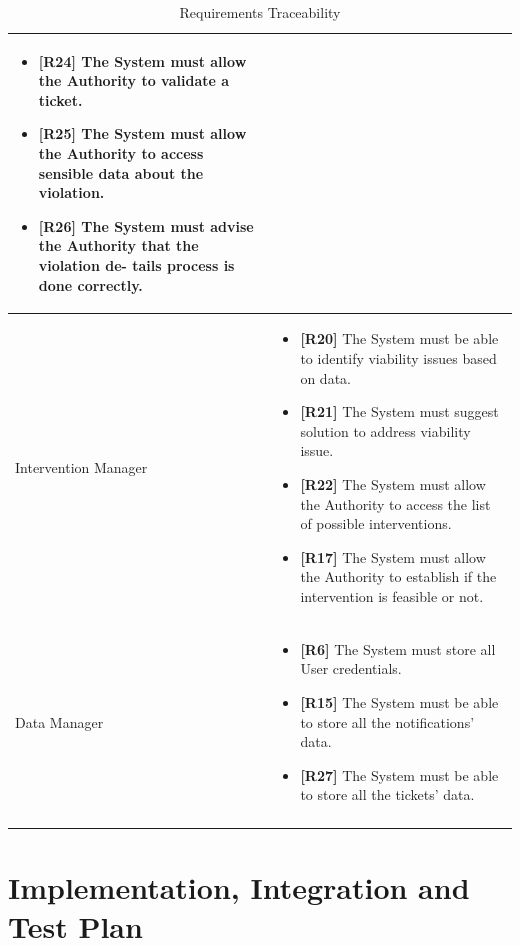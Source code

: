 \documentclass{article}
\begin{document}
\begin{longtable}{| p{5 cm} | p{8 cm} |}
\begin{itemize}
			\item  {{\bf [R24]} The System must allow the Authority to validate a ticket.}
			\item  {{\bf [R25]} The System must allow the Authority to access sensible data
about the violation.}
			\item  {{\bf [R26]} The System must advise the Authority that the violation de- tails process is done correctly.}
		\end{itemize}		\\	 \hline	
			\newline Intervention Manager & 
		\begin{itemize}
			\item  {{\bf [R20]} The System must be able to identify viability issues based on data.}
			\item  {{\bf [R21]} The System must suggest solution to address viability issue.}
			\item  {{\bf [R22]} The System must allow the Authority to access the list of possible interventions.
}
			\item  {{\bf [R17]} The System must allow the Authority to establish if the intervention is feasible or not.}
		\end{itemize}		\\	 \hline	
			\newline Data Manager & 
		\begin{itemize}
			\item {{\bf [R6]} The System must store all User credentials.}

			\item  {{\bf [R15]} The System must be able to store all the notifications’ data.}
			\item   {{\bf [R27]} The System must be able to store all the tickets’ data.}
		\end{itemize}		\\	 \hline			
		\caption{Requirements Traceability}	
		
	\end{longtable}
	
	\pagebreak
	
	
\section{Implementation, Integration and Test Plan}
\end{document}
